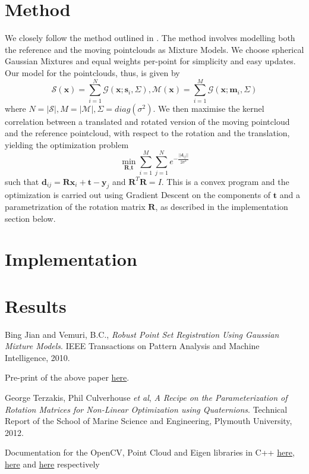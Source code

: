 \documentclass[11pt, a4paper]{article}
\begin{document}
\section{Method}
We closely follow the method outlined in \cite{main}. The method involves modelling both the reference and the moving pointclouds as Mixture Models. We choose spherical Gaussian Mixtures and equal weights per-point for simplicity and easy updates. Our model for the pointclouds, thus, is given by $$\mathcal{S}(\textbf{x}) = \sum_{i=1}^N \mathcal{G}(\textbf{x}; \textbf{s}_i, \Sigma), \mathcal{M}(\textbf{x}) = \sum_{i=1}^M \mathcal{G}(\textbf{x}; \textbf{m}_i, \Sigma)$$ where $N = |\mathcal{S}|, M = |\mathcal{M}|, \Sigma = diag(\sigma^2)$. We then maximise the kernel correlation between a translated and rotated version of the moving pointcloud and the reference pointcloud, with respect to the rotation and the translation, yielding the optimization problem $$\min_{\textbf{R}, \textbf{t}} \sum_{i=1}^M \sum_{j=1}^N e^{-\frac{|| \textbf{d}_{ij} ||}{2 \sigma^2}}$$ such that $\textbf{d}_{ij} = \textbf{Rx}_i + \textbf{t} - \textbf{y}_j$ and $\textbf{R}^T \textbf{R} = I$. This is a convex program and the optimization is carried out using Gradient Descent on the components of $\textbf{t}$ and a parametrization of the rotation matrix $\textbf{R}$, as described in the implementation section below.

\section{Implementation}

\section{Results}


\begin{thebibliography}{9}

  Bing Jian and Vemuri, B.C.,
  \emph{Robust Point Set Registration Using Gaussian Mixture Models}.
  IEEE Transactions on Pattern Analysis and Machine Intelligence,
  2010.
  
  Pre-print of the above paper \href{http://code.google.com/p/gmmreg/downloads/detail?name=gmmreg_PAMI_preprint.pdf}{here}.
  
  George Terzakis, Phil Culverhouse \textit{et al},
  \emph{A Recipe on the Parameterization of Rotation Matrices for Non-Linear Optimization using Quaternions}.
  Technical Report of the School of Marine Science and Engineering, Plymouth University,
  2012.
  
  Documentation for the OpenCV, Point Cloud and Eigen libraries in C++ \href{http://docs.opencv.org/}{here}, \href{http://pointclouds.org/documentation/}{here} and \href{http://eigen.tuxfamily.org/dox/}{here} respectively

\end{thebibliography}
\end{document}
